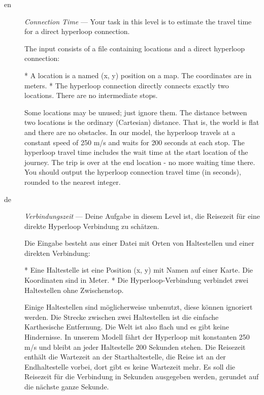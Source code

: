 \documentclass[a4paper,11pt]{article}
\begin{document}
\begin{description} %
  \item[en] \emph{Connection Time} --- 
    Your task in this level is to estimate the travel time for a direct hyperloop
    connection.
    
    The input consists of a file containing locations and a direct hyperloop
    connection:
    
     * A location is a named (x, y) position on a map. The coordinates are in
       meters.
     * The hyperloop connection directly connects exactly two locations. There are
       no intermediate stops.
    
    Some locations may be unused; just ignore them.
    The distance between two locations is the ordinary (Cartesian) distance. That
    is, the world is flat and there are no obstacles.
    In our model, the hyperloop travels at a constant speed of 250 m/s and waits for
    200 seconds at each stop. The hyperloop travel time includes the wait time at
    the start location of the journey. The trip is over at the end location - no
    more waiting time there.
    You should output the hyperloop connection travel time (in seconds), rounded to
    the nearest integer.
  
  \item[de] \emph{Verbindungszeit} --- 
    Deine Aufgabe in diesem Level ist, die Reisezeit für eine direkte Hyperloop
    Verbindung zu schätzen.
    
    Die Eingabe besteht aus einer Datei mit Orten von Haltestellen und einer
    direkten Verbindung:
    
     * Eine Haltestelle ist eine Position (x, y) mit Namen auf einer Karte. Die
       Koordinaten sind in Meter.
     * Die Hyperloop-Verbindung verbindet zwei Haltestellen ohne Zwischenstop.
    
    Einige Haltestellen sind möglicherweise unbenutzt, diese können ignoriert
    werden.
    Die Strecke zwischen zwei Haltestellen ist die einfache Karthesische Entfernung.
    Die Welt ist also flach und es gibt keine Hindernisse.
    In unserem Modell fährt der Hyperloop mit konstanten 250 m/s und bleibt an jeder
    Haltestelle 200 Sekunden stehen. Die Reisezeit enthält die Wartezeit an der
    Starthaltestelle, die Reise ist an der Endhaltestelle vorbei, dort gibt es keine
    Wartezeit mehr.
    Es soll die Reisezeit für die Verbindung in Sekunden ausgegeben werden, gerundet
    auf die nächste ganze Sekunde.
  
\end{description}
\end{document}
